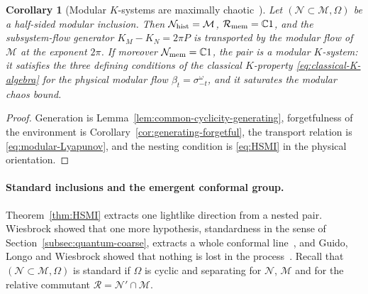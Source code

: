 \documentclass[a4paper,11pt]{article}
\newtheorem{corollary}[theorem]{Corollary}
\theoremstyle{definition}
\begin{document}
\begin{corollary}[Modular $K$-systems are maximally chaotic~{\cite{OFLLM2024}}]\label{cor:maximal-chaos-K-system}
Let $(\mathcal N\subset\mathcal M,\Omega)$ be a half-sided modular inclusion. Then $\mathcal N_{\rm hist}=\mathcal M$, $\mathcal R_{\rm mem}=\mathbb C1$, and the subsystem-flow generator $K_M-K_N=2\pi P$ is transported by the modular flow of $\mathcal M$ at the exponent $2\pi$. If moreover $\mathcal N_{\rm mem}=\mathbb C1$, the pair is a modular $K$-system: it satisfies the three defining conditions of the classical $K$-property \eqref{eq:classical-K-algebra} for the physical modular flow $\beta_t=\sigma^\omega_{-t}$, and it saturates the modular chaos bound.
\end{corollary}
\begin{proof}
Generation is Lemma~\ref{lem:common-cyclicity-generating}, forgetfulness of the environment is Corollary~\ref{cor:generating-forgetful}, the transport relation is \eqref{eq:modular-Lyapunov}, and the nesting condition is \eqref{eq:HSMI} in the physical orientation.
\end{proof}

\paragraph{Standard inclusions and the emergent conformal group.}
Theorem~\ref{thm:HSMI} extracts one lightlike direction from a nested pair. Wiesbrock showed that one more hypothesis, standardness in the sense of Section~\ref{subsec:quantum-coarse}, extracts a whole conformal line~\cite{Wiesbrock1993b}, and Guido, Longo and Wiesbrock showed that nothing is lost in the process~\cite{GuidoLongoWiesbrock1998}. Recall that $(\mathcal N\subset\mathcal M,\Omega)$ is standard if $\Omega$ is cyclic and separating for $\mathcal N$, $\mathcal M$ and for the relative commutant $\mathcal R=\mathcal N'\cap\mathcal M$.
\end{document}
